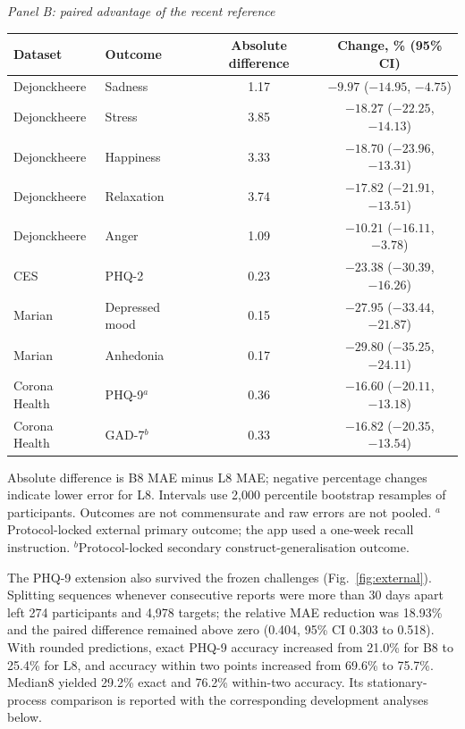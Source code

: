 \documentclass[pdflatex,sn-vancouver-num]{sn-jnl}
\begin{document}
\begin{table}[!htbp]
\medskip
\textit{Panel B: paired advantage of the recent reference}\\[3pt]
\begin{tabular}{@{}llcc@{}}
\toprule
Dataset & Outcome & Absolute difference & Change, \% (95\% CI)\\
\midrule
Dejonckheere & Sadness & 1.17 & $-9.97$ ($-14.95$, $-4.75$)\\
Dejonckheere & Stress & 3.85 & $-18.27$ ($-22.25$, $-14.13$)\\
Dejonckheere & Happiness & 3.33 & $-18.70$ ($-23.96$, $-13.31$)\\
Dejonckheere & Relaxation & 3.74 & $-17.82$ ($-21.91$, $-13.51$)\\
Dejonckheere & Anger & 1.09 & $-10.21$ ($-16.11$, $-3.78$)\\
CES & PHQ-2 & 0.23 & $-23.38$ ($-30.39$, $-16.26$)\\
Marian & Depressed mood & 0.15 & $-27.95$ ($-33.44$, $-21.87$)\\
Marian & Anhedonia & 0.17 & $-29.80$ ($-35.25$, $-24.11$)\\
Corona Health & PHQ-9$^{a}$ & 0.36 & $-16.60$ ($-20.11$, $-13.18$)\\
Corona Health & GAD-7$^{b}$ & 0.33 & $-16.82$ ($-20.35$, $-13.54$)\\
\bottomrule
\end{tabular}
\begin{flushleft}\footnotesize Absolute difference is B8 MAE minus L8 MAE; negative percentage changes indicate lower error for L8. Intervals use 2,000 percentile bootstrap resamples of participants. Outcomes are not commensurate and raw errors are not pooled. $^{a}$Protocol-locked external primary outcome; the app used a one-week recall instruction. $^{b}$Protocol-locked secondary construct-generalisation outcome.\end{flushleft}
\end{table}

The PHQ-9 extension also survived the frozen challenges (Fig.~\ref{fig:external}). Splitting sequences whenever consecutive reports were more than 30 days apart left 274 participants and 4,978 targets; the relative MAE reduction was 18.93\% and the paired difference remained above zero (0.404, 95\% CI 0.303 to 0.518). With rounded predictions, exact PHQ-9 accuracy increased from 21.0\% for B8 to 25.4\% for L8, and accuracy within two points increased from 69.6\% to 75.7\%. Median8 yielded 29.2\% exact and 76.2\% within-two accuracy. Its stationary-process comparison is reported with the corresponding development analyses below.
\end{document}
